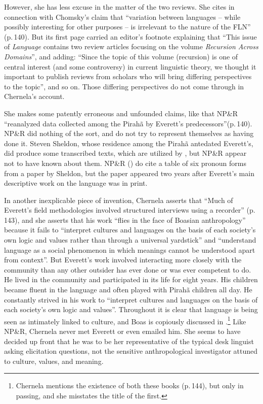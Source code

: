 \documentclass[output=paper,colorlinks,citecolor=brown
]{langscibook}
\begin{document}
However, she has less excuse in the matter of the two reviews.
She cites \citet{Hornstein19} in connection with Chomsky's claim
that ``variation between languages -- while possibly interesting
for other purposes -- is irrelevant to the nature of the FLN'' (p.\,140).
But its first page carried an editor's footnote explaining that
``This issue of \textit{Language} contains two review articles
focusing on the volume \textit{Recursion Across Domains}'',
and adding: ``Since the topic of this volume (recursion) is one of
central interest (and some controversy) in current linguistic theory,
we thought it important to publish reviews from scholars who will
bring differing perspectives to the topic'', and so on.  Those
differing perspectives do not come through in Chernela's account.

She makes some patently erroneous and unfounded claims, like that
NP\&R ``reanalyzed data collected among the Pirah{\~a} by Everett's
predecessors''(p.\,140). NP\&R did nothing of the sort, and do not
try to represent themselves as having done it. Steven Sheldon, whose
residence among the Pirah{\~a} antedated Everett's, did produce some
transcribed texts, which are utilized by \citet{FutrellEtAl16},
but NP\&R appear not to have known about them. NP\&R
(\citeyear[391]{NevPesRod09a}) do cite a table of six pronoun forms
from a paper by Sheldon, but the paper \citep{Sheldon88} appeared two
years after Everett's main descriptive work on the language was in
print.

In another inexplicable piece of invention, Chernela asserts
that ``Much of Everett's field methodologies involved structured
interviews using a recorder'' (p.\,143), and she asserts that his
work ``flies in the face of Boasian anthropology'' because it fails
to ``interpret cultures and languages on the basis of each society's
own logic and values rather than through a universal yardstick'' and
``understand language as a social phenomenon in which meanings cannot
be understood apart from context''. But Everett's work involved
interacting more closely with the community than any other outsider
has ever done or was ever competent to do. He lived in the community
and participated in its life for eight years. His children became
fluent in the language and often played with Pirah{\~a} children
all day.  He constantly strived in his work to ``interpret cultures
and languages on the basis of each society's own logic and values''.
Throughout \citet{Everett12} it is clear that language is being seen
as intimately linked to culture, and Boas is copiously discussed in
\citet{Everett16}.\footnote{\label{chernela}%
   Chernela mentions the existence of both these books (p.\,144), but
   only in passing, and she misstates the title of the first.}
Like NP\&R, Chernela never met Everett or even emailed him.
She seems to have decided up front that he was to be her representative
of the typical desk linguist asking elicitation questions, not
the sensitive anthropological investigator attuned to culture, values,
and meaning.
\end{document}
